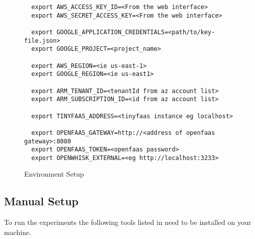 \documentclass[../main.tex]{subfiles}
\begin{document}
\begin{figure}[H]
\begin{tcolorbox}
\begin{verbatim}
  export AWS_ACCESS_KEY_ID=<From the web interface>
  export AWS_SECRET_ACCESS_KEY=<From the web interface>

  export GOOGLE_APPLICATION_CREDENTIALS=<path/to/key-file.json>
  export GOOGLE_PROJECT=<project_name>

  export AWS_REGION=<ie us-east-1>
  export GOOGLE_REGION=<ie us-east1>

  export ARM_TENANT_ID=<tenantId from az account list>
  export ARM_SUBSCRIPTION_ID=<id from az account list>

  export TINYFAAS_ADDRESS=<tinyfaas instance eg localhost>

  export OPENFAAS_GATEWAY=http://<address of openfaas gateway>:8080
  export OPENFAAS_TOKEN=<openfaas password>
  export OPENWHISK_EXTERNAL=<eg http://localhost:3233>
\end{verbatim}
\end{tcolorbox}
\caption{Environment Setup}%
\label{fig:envSetup}
\end{figure}


\subsection{Manual Setup}\label{sec:manualsetup}

To run the experiments the following tools listed in  need to be installed on your machine.
\end{document}

